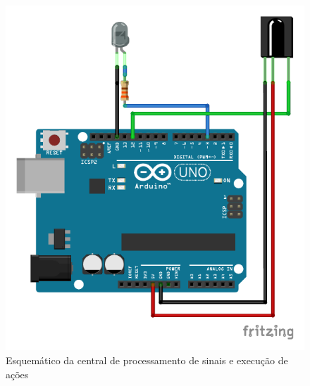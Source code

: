 \begin{figure}[ht]
    \centering
    \includegraphics{resources/esquematico_central_bb.pdf}
    \caption{Esquemático da central de processamento de sinais e execução de ações}
    \label{fig:esq_central}
\end{figure}

